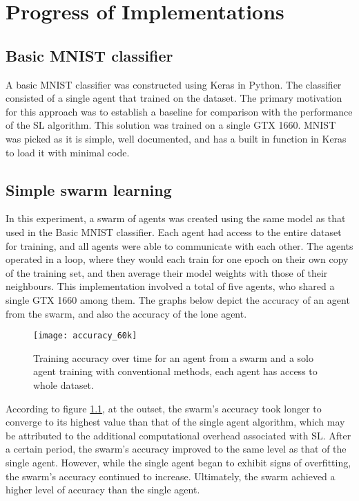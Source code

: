 \chapter{Progress of Implementations}

\section{Basic MNIST classifier}
A basic MNIST classifier was constructed using Keras in Python. The classifier consisted of a single agent that trained on the dataset. The primary motivation for this approach was to establish a baseline for comparison with the performance of the SL algorithm. This solution was trained on a single GTX 1660. MNIST was picked as it is simple, well documented, and has a built in function in Keras to load it with minimal code. 

\section{Simple swarm learning}
In this experiment, a swarm of agents was created using the same model as that used in the Basic MNIST classifier. Each agent had access to the entire dataset for training, and all agents were able to communicate with each other. The agents operated in a loop, where they would each train for one epoch on their own copy of the training set, and then average their model weights with those of their neighbours. This implementation involved a total of five agents, who shared a single GTX 1660 among them. The graphs below depict the accuracy of an agent from the swarm, and also the accuracy of the lone agent.

\begin{figure}[h]
	\centering
	\texttt{[image: accuracy\_60k]}
	\caption{Training accuracy over time for an agent from a swarm and a solo agent training with conventional methods, each agent has access to whole dataset.}
	\label{fig_60k}
\end{figure}

According to figure \ref{fig_60k}, at the outset, the swarm's accuracy took longer to converge to its highest value than that of the single agent algorithm, which may be attributed to the additional computational overhead associated with SL. After a certain period, the swarm's accuracy improved to the same level as that of the single agent. However, while the single agent began to exhibit signs of overfitting, the swarm's accuracy continued to increase. Ultimately, the swarm achieved a higher level of accuracy than the single agent.

